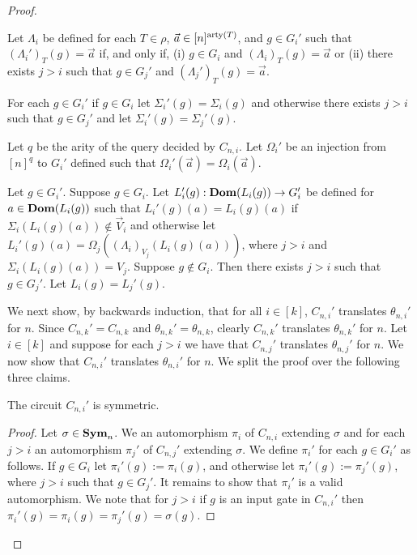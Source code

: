 \documentclass[../main/thesis.tex]{subfiles}
\begin{document}
\begin{proof}
\begin{myitemize}
  \item Let $\Lambda_i$ be defined for each $T \in \rho$, $\vec{a} \in
    [n]^{\mathrm{arty}(T)}$, and $g \in G_i'$ such that $(\Lambda_i')_{T} (g) = \vec{a}$
    if, and only if, (i) $g \in G_i$ and $(\Lambda_i)_{T}(g) = \vec{a}$ or (ii)
    there exists $j > i$ such that $g \in G_j'$ and $(\Lambda_j')_T (g) =
    \vec{a}$.
    
  \item For each $g \in G_i'$ if $g \in G_i$ let $\Sigma_i' (g) = \Sigma_i (g)$
    and otherwise there exists $j > i$ such that $g \in G_j'$ and let $\Sigma_i'
    (g) = \Sigma_j' (g)$.
    
  \item Let $q$ be the arity of the query decided by $C_{n, i}$. Let $\Omega_i'$
    be an injection from $[n]^{q}$ to $G_i'$ defined such that $\Omega_i'
    (\vec{a}) = \Omega_i(\vec{a})$.
    
  \item Let $g \in G_i'$. Suppose $g \in G_i$. Let $L_i' (g) : \text{\textbf{Dom}} (L_i(g)) \rightarrow
    G_i'$ be defined for $a \in \text{\textbf{Dom}}(L_i(g))$ such that $L_i' (g)(a) =
    L_i(g)(a)$ if $\Sigma_i (L_i (g)(a)) \not\in \vec{V}_i$ and otherwise let
    $L_i'(g)(a) = \Omega_j((\Lambda_i)_{V_j}(L_i(g)(a)))$, where $j > i$ and
    $\Sigma_i (L_i (g)(a)) = V_j$. Suppose $g \not\in G_i$. Then there exists $j
    > i$ such that $g \in G_j'$. Let $L_i(g) = L_j'(g)$.
  \end{myitemize}
  
  We next show, by backwards induction, that for all $i \in [k]$, $C_{n, i}'$
  translates $\theta_{n, i}'$ for $n$. Since $C_{n, k}' = C_{n, k}$ and
  $\theta_{n, k}' = \theta_{n, k}$, clearly $C_{n, k}'$ translates $\theta_{n,
    k}'$ for $n$. Let $i \in [k]$ and suppose for each $j > i$ we have that
  $C_{n, j}'$ translates $\theta_{n, j}'$ for $n$. We now show that $C_{n, i}'$
  translates $\theta_{n, i}'$ for $n$. We split the proof over the following
  three claims.

\begin{claim}
  The circuit $C_{n, i}'$ is symmetric.
\end{claim}
\begin{proof}
  Let $\sigma \in \text{\textbf{Sym}}_n$. We an automorphism $\pi_i$ of $C_{n, i}$ extending
  $\sigma$ and for each $j > i$ an automorphism $\pi_j'$ of $C_{n, j}'$
  extending $\sigma$. We define $\pi_i'$ for each $g \in G_i'$ as follows. If $g
  \in G_i$ let $\pi_i' (g) := \pi_i (g)$, and otherwise let $\pi_i' (g) :=
  \pi_j' (g)$, where $j > i$ such that $g \in G_j'$. It remains to show that
  $\pi_i'$ is a valid automorphism. We note that for $j > i$ if $g$ is an input
  gate in $C_{n, i}'$ then $\pi_i' (g) = \pi_i (g) = \pi_j'(g) = \sigma(g)$.


\end{proof}
\end{proof}
\end{document}
